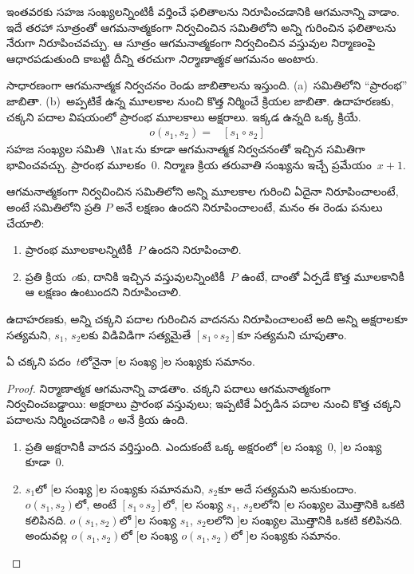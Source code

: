 \documentclass[../../../include/open-logic-section]{subfiles}
\begin{document}


ఇంతవరకు సహజ సంఖ్యలన్నింటికీ వర్తించే ఫలితాలను
నిరూపించడానికి ఆగమనాన్ని వాడాం. ఇదే తరహా సూత్రంతో
ఆగమనాత్మకంగా నిర్వచించిన సమితిలోని అన్ని
 గురించిన ఫలితాలను నేరుగా నిరూపించవచ్చు.
ఆ సూత్రం ఆగమనాత్మకంగా నిర్వచించిన వస్తువుల నిర్మాణంపై
ఆధారపడుతుంది కాబట్టి దీన్ని తరచుగా \emph{నిర్మాణాత్మక} ఆగమనం అంటారు.

సాధారణంగా ఆగమనాత్మక నిర్వచనం రెండు జాబితాలను ఇస్తుంది.
(a)~సమితిలోని ``ప్రారంభ''  జాబితా.
(b)~అప్పటికే ఉన్న మూలకాల నుంచి కొత్త
 నిర్మించే క్రియల జాబితా.
ఉదాహరణకు, చక్కని పదాల విషయంలో ప్రారంభ మూలకాలు అక్షరాలు.
ఇక్కడ ఉన్నది ఒక్క క్రియే.
\begin{align*}
  o(s_1, s_2) = & [s_1 \circ s_2]
\end{align*}
సహజ సంఖ్యల సమితి~$\Nat$ను కూడా ఆగమనాత్మక నిర్వచనంతో
ఇచ్చిన సమితిగా భావించవచ్చు. ప్రారంభ మూలకం~$0$. నిర్మాణ క్రియ తరువాతి సంఖ్యను ఇచ్చే ప్రమేయం~$x + 1$.

ఆగమనాత్మకంగా నిర్వచించిన సమితిలోని అన్ని మూలకాల గురించి ఏదైనా నిరూపించాలంటే, అంటే సమితిలోని ప్రతి  $P$ అనే లక్షణం ఉందని నిరూపించాలంటే, మనం ఈ రెండు పనులు చేయాలి:
\begin{enumerate}
\item ప్రారంభ మూలకాలన్నిటికీ~$P$ ఉందని నిరూపించాలి.
\item ప్రతి క్రియ~$o$కు, దానికి ఇచ్చిన వస్తువులన్నింటికీ~$P$ ఉంటే, దాంతో ఏర్పడే కొత్త మూలకానికీ ఆ లక్షణం ఉంటుందని నిరూపించాలి.
\end{enumerate}
ఉదాహరణకు, అన్ని చక్కని పదాల గురించిన వాదనను నిరూపించాలంటే అది అన్ని అక్షరాలకూ సత్యమని, $s_1$, $s_2$లకు విడివిడిగా సత్యమైతే $[s_1 \circ s_2]$కూ సత్యమని చూపుతాం.

\begin{prop}
  ఏ చక్కని పదం~$t$లోనైనా $[$ల సంఖ్య $]$ల సంఖ్యకు సమానం.
\end{prop}

\begin{proof}
నిర్మాణాత్మక ఆగమనాన్ని వాడతాం. చక్కని పదాలు ఆగమనాత్మకంగా నిర్వచించబడ్డాయి: అక్షరాలు ప్రారంభ వస్తువులు; ఇప్పటికే ఏర్పడిన పదాల నుంచి కొత్త చక్కని పదాలను నిర్మించడానికి $o$ అనే క్రియ ఉంది.
\begin{enumerate}
\item ప్రతి అక్షరానికీ వాదన వర్తిస్తుంది. ఎందుకంటే ఒక్క అక్షరంలో $[$ల సంఖ్య~$0$, $]$ల సంఖ్య కూడా~$0$.
\item $s_1$లో $[$ల సంఖ్య $]$ల సంఖ్యకు సమానమని, $s_2$కూ అదే సత్యమని అనుకుందాం. $o(s_1, s_2)$లో, అంటే $[s_1 \circ s_2]$లో, $[$ల సంఖ్య $s_1$, $s_2$లలోని $[$ల సంఖ్యల మొత్తానికి ఒకటి కలిపినది. $o(s_1, s_2)$లో $]$ల సంఖ్య $s_1$, $s_2$లలోని $]$ల సంఖ్యల మొత్తానికి ఒకటి కలిపినది. అందువల్ల $o(s_1, s_2)$లో $[$ల సంఖ్య $o(s_1,s_2)$లో $]$ల సంఖ్యకు సమానం.
\end{enumerate}
\end{proof}
\end{document}

